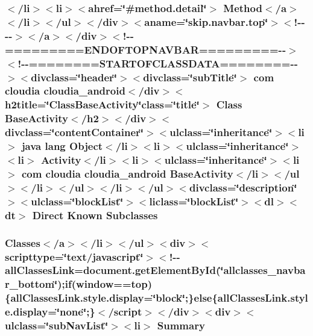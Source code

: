 \hypertarget{_base_activity_8html_a0220837e30df335e0037d028da699860}{
\subsubsection[{Subclasses}]{\setlength{\rightskip}{0pt plus 5cm}$<$/li$>$$<$li$>$$<$ahref=\char`\"{}\#method.\-detail\char`\"{}$>$ Method$<$/{\bf a}$>$$<$/li$>$$<$/ul$>$$<$/div$>$$<$aname=\char`\"{}skip.\-navbar.\-top\char`\"{}$>$$<$!-\/-\/-\/-\/$>$$<$/a$>$$<$/div$>$$<$!-\/-\/=========E\-N\-D\-O\-F\-T\-O\-P\-N\-A\-V\-B\-A\-R=========-\/-\/$>$$<$!-\/-\/========S\-T\-A\-R\-T\-O\-F\-C\-L\-A\-S\-S\-D\-A\-T\-A========-\/-\/$>$$<$divclass=\char`\"{}header\char`\"{}$>$$<$divclass=\char`\"{}sub\-Title\char`\"{}$>$ com cloudia cloudia\-\_\-android$<$/div$>$$<$h2title=\char`\"{}Class\-Base\-Activity\char`\"{}class=\char`\"{}title\char`\"{}$>$ Class {\bf Base\-Activity}$<$/h2$>$$<$/div$>$$<$divclass=\char`\"{}content\-Container\char`\"{}$>$$<$ulclass=\char`\"{}inheritance\char`\"{}$>$$<$li$>$ java lang Object$<$/li$>$$<$li$>$$<$ulclass=\char`\"{}inheritance\char`\"{}$>$$<$li$>$ Activity$<$/li$>$$<$li$>$$<$ulclass=\char`\"{}inheritance\char`\"{}$>$$<$li$>$ com cloudia cloudia\-\_\-android {\bf Base\-Activity}$<$/li$>$$<$/ul$>$$<$/li$>$$<$/ul$>$$<$/li$>$$<$/ul$>$$<$divclass=\char`\"{}description\char`\"{}$>$$<$ulclass=\char`\"{}block\-List\char`\"{}$>$$<$liclass=\char`\"{}block\-List\char`\"{}$>$$<$dl$>$$<${\bf dt}$>$ Direct Known Subclasses}}\label{_base_activity_8html_a0220837e30df335e0037d028da699860}
\hypertarget{_base_activity_8html_a6f9ab45abc9b0679dc1b132fbacfc681}{
\subsubsection[{Summary}]{\setlength{\rightskip}{0pt plus 5cm}Classes$<$/{\bf a}$>$$<$/li$>$$<$/ul$>$$<$div$>$$<$scripttype=\char`\"{}text/javascript\char`\"{}$>$$<$!-\/-\/all\-Classes\-Link=document.\-get\-Element\-By\-Id(\char`\"{}allclasses\-\_\-navbar\-\_\-bottom\char`\"{});if(window==top)\{all\-Classes\-Link.\-style.\-display=\char`\"{}block\char`\"{};\}else\{all\-Classes\-Link.\-style.\-display=\char`\"{}none\char`\"{};\}$<$/script$>$$<$/div$>$$<$div$>$$<$ulclass=\char`\"{}sub\-Nav\-List\char`\"{}$>$$<$li$>$ Summary}}\label{_base_activity_8html_a6f9ab45abc9b0679dc1b132fbacfc681}
